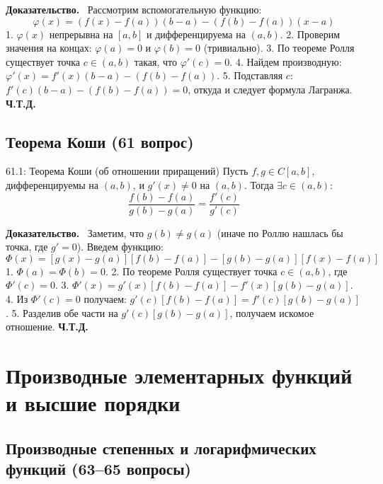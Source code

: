 \documentclass[a4paper,12pt]{article}
\newcommand{\myproof}{\textbf{Доказательство.}\ }
\begin{document}
	\myproof
	Рассмотрим вспомогательную функцию:
	$$ \varphi(x) = (f(x) - f(a))(b - a) - (f(b) - f(a))(x - a) $$
	1. $\varphi(x)$ непрерывна на $[a, b]$ и дифференцируема на $(a, b)$.
	2. Проверим значения на концах: $\varphi(a) = 0$ и $\varphi(b) = 0$ (тривиально).
	3. По теореме Ролля существует точка $c \in (a, b)$ такая, что $\varphi'(c) = 0$.
	4. Найдем производную: $\varphi'(x) = f'(x)(b - a) - (f(b) - f(a))$.
	5. Подставляя $c$: $f'(c)(b - a) - (f(b) - f(a)) = 0$, откуда и следует формула Лагранжа. \textbf{Ч.Т.Д.}
	
	
	
	
	
	\vspace{1cm}
	\subsection{Теорема Коши (61 вопрос)}
	
	\begin{theorembox}{61.1: Теорема Коши (об отношении приращений)}
		Пусть $f, g \in C[a, b]$, дифференцируемы на $(a, b)$, и $g'(x) \neq 0$ на $(a, b)$. Тогда $\exists c \in (a, b)$:
		$$ \frac{f(b) - f(a)}{g(b) - g(a)} = \frac{f'(c)}{g'(c)} $$
	\end{theorembox}
	
	\myproof
	Заметим, что $g(b) \neq g(a)$ (иначе по Роллю нашлась бы точка, где $g'=0$). Введем функцию:
	$$ \Phi(x) = [g(x) - g(a)][f(b) - f(a)] - [g(b) - g(a)][f(x) - f(a)] $$
	1. $\Phi(a) = \Phi(b) = 0$.
	2. По теореме Ролля существует точка $c \in (a, b)$, где $\Phi'(c) = 0$.
	3. $\Phi'(x) = g'(x)[f(b) - f(a)] - f'(x)[g(b) - g(a)]$.
	4. Из $\Phi'(c) = 0$ получаем: $g'(c)[f(b) - f(a)] = f'(c)[g(b) - g(a)]$.
	5. Разделив обе части на $g'(c)[g(b) - g(a)]$, получаем искомое отношение. \textbf{Ч.Т.Д.}
	
	
	
	
	
	
	
	
	\newpage
	\section{Производные элементарных функций и высшие порядки}
	
	\subsection{Производные степенных и логарифмических функций (63--65 вопросы)}
	
\end{document}
